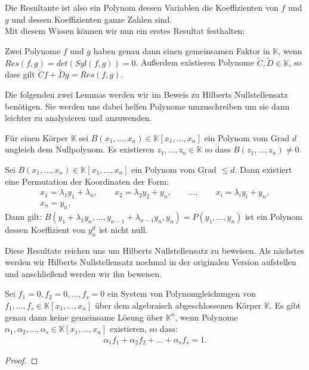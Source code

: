 \noindent Die Resultante ist also ein Polynom dessen Variablen die Koeffizienten von $f$ und $g$ und dessen Koeffizienten ganze Zahlen sind.\\
\noindent Mit diesem Wissen können wir nun ein erstes Resultat festhalten:

\begin{theorem}
Zwei Polynome $f$ und $g$ haben genau dann einen gemeinsamen Faktor in $\mathbb{K}$, wenn $Res(f,g) = det(Syl(f,g)) = 0$. Außerdem existieren Polynome $\tilde{C},\tilde{D} \in \mathbb{K}$, so dass gilt $\tilde{C}f + \tilde{D}g = Res(f,g)$.
\end{theorem}

\noindent Die folgenden zwei Lemmas werden wir im Beweis zu Hilberts Nullstellensatz benötigen. Sie werden uns dabei helfen Polynome umzuschreiben um sie dann leichter zu analysieren und anzuwenden.

\begin{lemma}
Für einen Körper $\mathbb{K}$ sei $B(x_1,\ldots,x_n)\in \mathbb{K}[x_1,\ldots,x_n]$ ein Polynom vom Grad $d$ ungleich dem Nullpolynom. Es existieren $z_1,\ldots,z_n \in \mathbb{K}$ so dass $B(z_1,\ldots,z_n) \not = 0$.
\end{lemma}

\begin{lemma}
Sei $B(x_1,\ldots,x_n)\in \mathbb{K}[x_1,\ldots,x_n]$ ein Polynom vom Grad $\le d$. Dann existiert eine Permutation der Koordinaten der Form:
\begin{align*}
x_1 = \lambda_1y_1+\lambda_n, \qquad x_2 = \lambda_2y_2 + y_n, \qquad \ldots, \qquad x_i = \lambda_iy_i+y_n, \\
x_n = y_n,
\end{align*}
Dann gilt: $B(y_1+\lambda_1y_n,\ldots,y_{n-1}+\lambda_{n-1}y_n,y_n) = P(y_1,\ldots,y_n)$ ist ein Polynom dessen Koeffizient von $y_n^d$ ist nicht null.
\end{lemma}

\noindent Diese Resultate reichen uns um Hilberts Nullstellensatz zu beweisen. Als nächstes werden wir Hilberts Nullstellensatz nochmal in der originalen Version aufstellen und anschließend werden wir ihn beweisen.

\begin{theorem}
Sei $f_1 = 0, f_2 = 0, \ldots, f_s = 0$ ein System von Polynomgleichungen von $f_1,\ldots,f_s \in \mathbb{K}[x_1,\ldots,x_n]$ über dem algebraisch abgeschlossenen Körper $\mathbb{K}$. Es gibt genau dann keine gemeinsame Lösung über $\mathbb{K}^n$, wenn Polynome $\alpha_1,\alpha_2,\ldots,\alpha_s \in \mathbb{K}[x_1,\ldots,x_n]$ existieren, so dass:
\begin{align*}
\alpha_1f_1 + \alpha_2f_2+ \ldots + \alpha_sf_s = 1.
\end{align*}
\end{theorem}

\begin{proof}

\end{proof}

